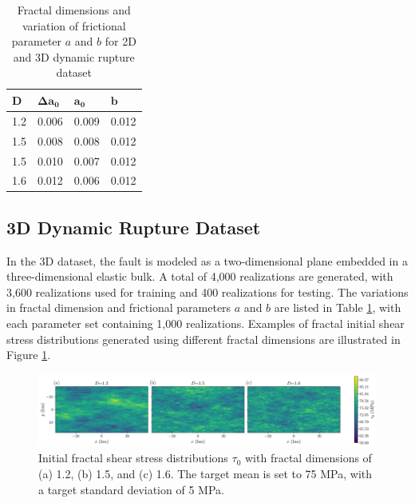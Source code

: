 \documentclass[draft]{agujournal2019}
\begin{document}
\begin{table}[ht!]
\caption{\label{table:dataset_description}Fractal dimensions and variation of frictional parameter \(a\) and \(b\) for 2D and 3D dynamic rupture dataset}
\centering
\begin{tabular}{@{}llll@{}} 
\toprule
\textbf{$\mathbf{D}$} & \textbf{$\mathbf{\Delta a_{0}}$} & \textbf{$\mathbf{a_0}$} & \textbf{$\mathbf{b}$} \\ \midrule
1.2                 & 0.006                 & 0.009              & 0.012   \\ 
1.5                 & 0.008                 & 0.008              & 0.012   \\
1.5                 & 0.010                 & 0.007              & 0.012   \\
1.6                 & 0.012                 & 0.006              & 0.012   \\
\bottomrule
\end{tabular}
\end{table}

\subsection{3D Dynamic Rupture Dataset}
\label{sec:3d}

In the 3D dataset, the fault is modeled as a two-dimensional plane embedded in a three-dimensional elastic bulk. A total of 4,000 realizations are generated, with 3,600 realizations used for training and 400 realizations for testing. The variations in fractal dimension and frictional parameters \( a \) and \( b \) are listed in Table \ref{table:dataset_description}, with each parameter set containing 1,000 realizations. Examples of fractal initial shear stress distributions generated using different fractal dimensions are illustrated in Figure \ref{fig:3D_contour}.

\begin{figure}
\centering
\includegraphics[width=1.0\linewidth]{3D_input_contour.png}
\caption{\label{fig:3D_contour}Initial fractal shear stress distributions \(\tau_{0}\) with fractal dimensions of (a) 1.2, (b) 1.5, and (c) 1.6. The target mean is set to 75 MPa, with a target standard deviation of 5 MPa.
}
\end{figure}
\end{document}
